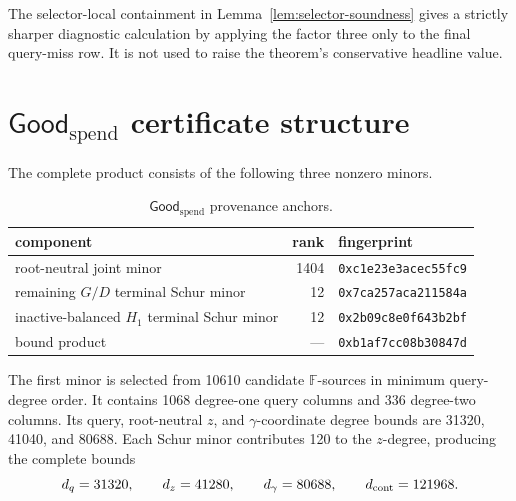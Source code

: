 The selector-local containment in Lemma~\ref{lem:selector-soundness} gives a
strictly sharper diagnostic calculation by applying the factor three only to
the final query-miss row.  It is not used to raise the theorem's conservative
headline value.

\section{\texorpdfstring{\(\mathsf{Good}_{\mathrm{spend}}\)}{GoodSpend} certificate structure}
\label{app:goodspend-certificate}

The complete product consists of the following three nonzero minors.
\begin{table}[ht]
\centering
\caption{\(\mathsf{Good}_{\mathrm{spend}}\) provenance anchors.}
\label{tab:goodspend-fingerprints}
\begin{tabular}{@{}lrl@{}}
\toprule
component & rank & fingerprint \\
\midrule
root-neutral joint minor & 1404 & \texttt{0xc1e23e3acec55fc9} \\
remaining \(G/D\) terminal Schur minor & 12 & \texttt{0x7ca257aca211584a} \\
inactive-balanced \(H_1\) terminal Schur minor & 12 & \texttt{0x2b09c8e0f643b2bf} \\
bound product & --- & \texttt{0xb1af7cc08b30847d} \\
\bottomrule
\end{tabular}
\end{table}

The first minor is selected from 10610 candidate \(\mathbb F\)-sources in
minimum query-degree order.  It contains 1068 degree-one query columns and
336 degree-two columns.  Its query, root-neutral \(z\), and
\(\gamma\)-coordinate degree bounds are 31320, 41040, and 80688.  Each Schur
minor contributes 120 to the \(z\)-degree, producing the complete bounds
\[
 d_q=31320,\qquad d_z=41280,\qquad
 d_\gamma=80688,\qquad d_{\rm cont}=121968.
\]

